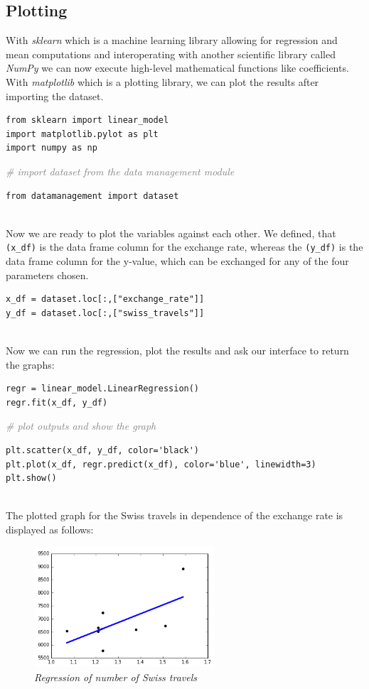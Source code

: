 \documentclass[12pt,a4paper,bibliography=totocnumbered,listof=totocnumbered]{scrartcl}
\begin{document}
\newpage
\subsection{Plotting}
With \textit{sklearn} which is a machine learning library allowing for regression and mean computations and interoperating with another scientific library called \textit{NumPy} we can now execute high-level mathematical functions like coefficients. With \textit{matplotlib} which is a plotting library, we can plot the results after importing the dataset. 
\ \\
\begin{verbatim}
from sklearn import linear_model
import matplotlib.pylot as plt
import numpy as np
\end{verbatim}
\textcolor{gray}{\textit{\# import dataset from the data management module}}
\begin{verbatim}
from datamanagement import dataset
\end{verbatim}
\ \\
Now we are ready to plot the variables against each other. We defined, that \verb|(x_df)| is the data frame column for the exchange rate, whereas the \verb|(y_df)| is the data frame column for the y-value, which can be exchanged for any of the four parameters chosen. 
\ \\
\begin{verbatim}
x_df = dataset.loc[:,["exchange_rate"]]
y_df = dataset.loc[:,["swiss_travels"]]
\end{verbatim}
\ \\

Now we can run the regression, plot the results and ask our interface to return the graphs:
\ \\
\begin{verbatim}
regr = linear_model.LinearRegression()
regr.fit(x_df, y_df)
\end{verbatim}
\textcolor{gray}{\textit{\# plot outputs and show the graph}}
\begin{verbatim}
plt.scatter(x_df, y_df, color='black')
plt.plot(x_df, regr.predict(x_df), color='blue', linewidth=3)
plt.show()
\end{verbatim}
\ \\
The plotted graph for the Swiss travels in dependence of the exchange rate is displayed as follows: 
\begin{figure}[htbp] 
  \centering
     \includegraphics[width=0.6\textwidth]{lr_swiss_travels.png}
  \caption{\textit{Regression of number of Swiss travels}}
  \label{fig: figure3}
\end{figure}
\end{document}
